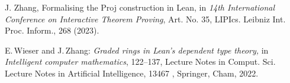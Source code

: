 \documentclass[graybox]{svmult}
\begin{document}
\begin{thebibliography}{99.}
J. Zhang, Formalising the Proj construction in Lean, in {\it 14th International Conference on Interactive Theorem Proving}, Art. No. 35, LIPIcs. Leibniz Int. Proc. Inform., 268 (2023).

E.\,Wieser and J.\,Zhang: {\it Graded rings in Lean's dependent type theory,} in {\it Intelligent computer mathematics}, 122--137, Lecture Notes in Comput. Sci. Lecture Notes in Artificial Intelligence, 13467 , Springer, Cham, 2022.

\end{thebibliography}

%
\end{document}
